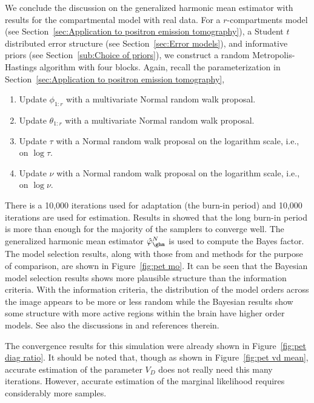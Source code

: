We conclude the discussion on the generalized harmonic mean estimator with
results for the \pet compartmental model with real data. For a
$r$-compartments \pet model (see Section~\ref{sec:Application to positron
  emission tomography}), a Student $t$ distributed error structure (see
Section~\ref{sec:Error models}), and informative priors (see
Section~\ref{sub:Choice of priors}), we construct a random Metropolis-Hastings
algorithm with four blocks. Again, recall the parameterization in
Section~\ref{sec:Application to positron emission tomography},
\begin{enumerate}
  \item Update $\phi_{1:r}$ with a multivariate Normal random walk proposal.
  \item Update $\theta_{1:r}$ with a multivariate Normal random walk proposal.
  \item Update $\tau$ with a Normal random walk proposal on the logarithm
    scale, i.e., on $\log\tau$.
  \item Update $\nu$ with a Normal random walk proposal on the logarithm
    scale, i.e., on $\log\nu$.
\end{enumerate}
There is a 10,000 iterations used for adaptation (the burn-in period) and
10,000 iterations are used for estimation. Results in \cite{Zhou2013} showed
that the long burn-in period is more than enough for the majority of the
samplers to converge well. The generalized harmonic mean estimator
$\hat\varphi_{\ghm}^N$ is used to compute the Bayes factor. The model
selection results, along with those from \aic and \bic methods for the purpose
of comparison, are shown in Figure~\ref{fig:pet mo}. It can be seen that the
Bayesian model selection results shows more plausible structure than the
information criteria. With the information criteria, the distribution of the
model orders across the image appears to be more or less random while the
Bayesian results show some structure with more active regions within the brain
have higher order models. See also the discussions in \cite{Zhou2013} and
references therein.

\afterpage{\clearpage}

The convergence results for this simulation were already shown in
Figure~\ref{fig:pet diag ratio}. It should be noted that, though as shown in
Figure~\ref{fig:pet vd mean}, accurate estimation of the parameter $V_D$ does
not really need this many iterations. However, accurate estimation of the
marginal likelihood requires considerably more samples.

